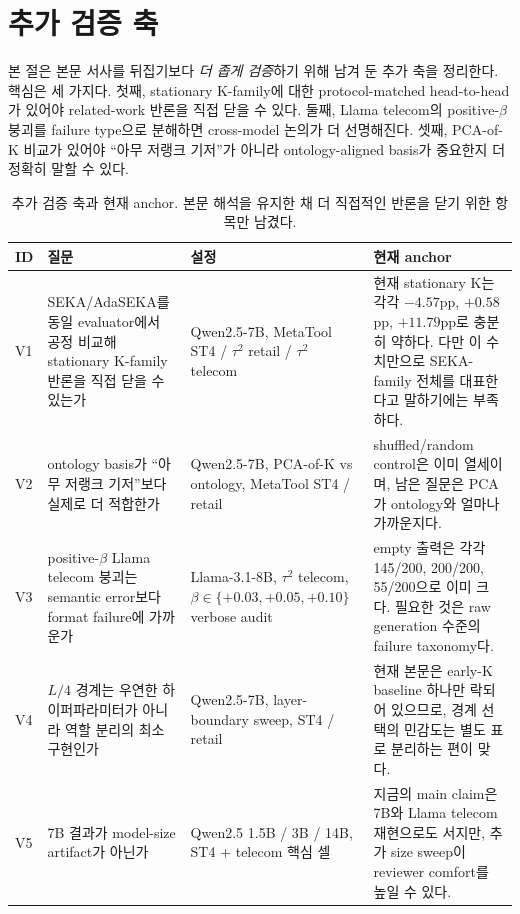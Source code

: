 \section{추가 검증 축}\label{app:planned-validation}\label{app:additional-validation}

본 절은 본문 서사를 뒤집기보다 \emph{더 좁게 검증}하기 위해 남겨 둔 추가 축을 정리한다. 핵심은 세 가지다. 첫째, stationary K-family에 대한 protocol-matched head-to-head가 있어야 related-work 반론을 직접 닫을 수 있다. 둘째, Llama telecom의 positive-$\beta$ 붕괴를 failure type으로 분해하면 cross-model 논의가 더 선명해진다. 셋째, PCA-of-K 비교가 있어야 ``아무 저랭크 기저''가 아니라 ontology-aligned basis가 중요한지 더 정확히 말할 수 있다.

\begin{table}[h]
\centering
\caption{추가 검증 축과 현재 anchor. 본문 해석을 유지한 채 더 직접적인 반론을 닫기 위한 항목만 남겼다.}
\label{tab:planned-validation}
\scriptsize
\begin{tabularx}{\linewidth}{@{}lXlX@{}}
\toprule
ID & 질문 & 설정 & 현재 anchor \\
\midrule
V1 & SEKA/AdaSEKA를 동일 evaluator에서 공정 비교해 stationary K-family 반론을 직접 닫을 수 있는가 & Qwen2.5-7B, MetaTool ST4 / $\tau^2$ retail / $\tau^2$ telecom & 현재 stationary K는 각각 $-4.57$pp, $+0.58$pp, $+11.79$pp로 충분히 약하다. 다만 이 수치만으로 SEKA-family 전체를 대표한다고 말하기에는 부족하다. \\
V2 & ontology basis가 ``아무 저랭크 기저''보다 실제로 더 적합한가 & Qwen2.5-7B, PCA-of-K vs ontology, MetaTool ST4 / retail & shuffled/random control은 이미 열세이며, 남은 질문은 PCA가 ontology와 얼마나 가까운지다. \\
V3 & positive-$\beta$ Llama telecom 붕괴는 semantic error보다 format failure에 가까운가 & Llama-3.1-8B, $\tau^2$ telecom, $\beta\in\{+0.03,+0.05,+0.10\}$ verbose audit & empty 출력은 각각 145/200, 200/200, 55/200으로 이미 크다. 필요한 것은 raw generation 수준의 failure taxonomy다. \\
V4 & $L/4$ 경계는 우연한 하이퍼파라미터가 아니라 역할 분리의 최소 구현인가 & Qwen2.5-7B, layer-boundary sweep, ST4 / retail & 현재 본문은 early-K baseline 하나만 락되어 있으므로, 경계 선택의 민감도는 별도 표로 분리하는 편이 맞다. \\
V5 & 7B 결과가 model-size artifact가 아닌가 & Qwen2.5 1.5B / 3B / 14B, ST4 + telecom 핵심 셀 & 지금의 main claim은 7B와 Llama telecom 재현으로도 서지만, 추가 size sweep이 reviewer comfort를 높일 수 있다. \\
\bottomrule
\end{tabularx}
\end{table}
